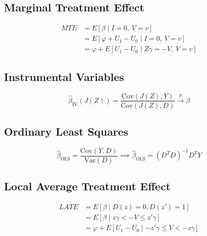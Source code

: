 \documentclass[9pt,twocolumn,twoside,]{pnas-new}
\begin{document}
\hypertarget{marginal-treatment-effect}{%
\subsection*{Marginal Treatment
Effect}\label{marginal-treatment-effect}}

\begin{align*}
MTE &= E \left[ \beta \mid I = 0,\ V = v \right] \\
&= E \left[ \varphi + U_1 - U_0 \mid I = 0,\ V = v \right] \\
&= \varphi + E \left[ U_1 - U_0 \mid Z \gamma = - V,\ V = v \right]
\end{align*}

\hypertarget{instrumental-variables}{%
\subsection*{Instrumental Variables}\label{instrumental-variables}}

\[
\hat{\beta}_{\text{IV}} (J(Z)) = \frac{\text{Cov}(J(Z), Y)}{\text{Cov}(J(Z), D)} \overset{p}{\longrightarrow} \beta
\]

\hypertarget{ordinary-least-squares}{%
\subsection*{Ordinary Least Squares}\label{ordinary-least-squares}}

\[
\hat{\beta}_{\text{OLS}} = \frac{\text{Cov}(Y, D)}{\text{Var}(D)} \implies \hat{\beta}_{\text{OLS}} = \left( D^T D \right)^{-1} D^T Y
\]

\hypertarget{local-average-treatment-effect}{%
\subsection*{Local Average Treatment
Effect}\label{local-average-treatment-effect}}

\begin{align*}
LATE &= E \left[ \beta \mid D(z) = 0, D(z') = 1 \right] \\
&= E \left[ \beta \mid z \gamma < - V \leq z' \gamma \right] \\
&= \varphi + E \left[ U_1 - U_0 \mid - z' \gamma \leq V < - z \gamma \right]
\end{align*}
\end{document}
